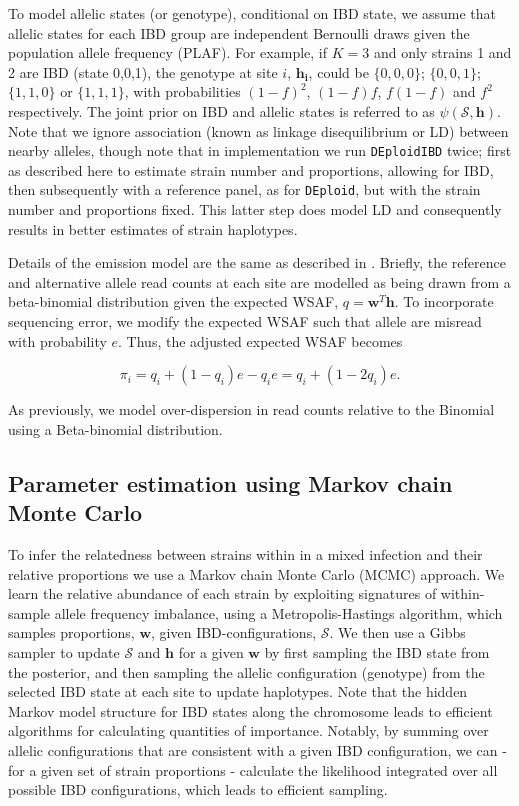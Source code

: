 \documentclass[9pt]{article}
\begin{document}
To model allelic states (or genotype), conditional on IBD state, we assume that allelic states for each IBD group are independent Bernoulli draws given the population allele frequency (PLAF).   For example, if $K=3$ and only strains 1 and 2 are IBD (state 0,0,1), the genotype at site $i$, $\mathbf{h_i}$, could be $\{0,0,0\}$; $\{0,0,1\}$; $\{1,1,0\}$ or $\{1,1,1\}$, with probabilities $(1-f)^2$, $(1-f)f$, $f(1-f)$ and $f^2$ respectively.   The joint prior on IBD and allelic states is referred to as $\psi(\mathcal{S},\mathbf{h})$.  Note that we ignore association (known as linkage disequilibrium or LD) between nearby alleles, though note that in implementation we run \texttt{DEploidIBD} twice; first as described here to estimate strain number and proportions, allowing for IBD, then subsequently with a reference panel, as for \texttt{DEploid}, but with the strain number and proportions fixed.  This latter step does model LD and consequently results in better estimates of strain haplotypes.

Details of the emission model are the same as described in \citet{Zhu2017}.  Briefly, the reference and alternative allele read counts at each site are modelled as being drawn from a beta-binomial distribution given the expected WSAF, $q = \mathbf{w}^T \mathbf{h}$.  To incorporate sequencing error, we modify the expected WSAF such that allele are misread with probability $e$. Thus, the adjusted expected WSAF becomes

\begin{equation} \label{eqn:adj_q}
\pi_i = q_i + (1 - q_i)e - q_ie = q_i + (1 - 2q_i)e.
\end{equation}

\noindent As previously, we model over-dispersion in read counts relative to the Binomial using a Beta-binomial distribution.


\subsection{Parameter estimation using Markov chain Monte Carlo}

To infer the relatedness between strains within in a mixed infection and their relative proportions we use a Markov chain Monte Carlo (MCMC) approach. We learn the relative abundance of each strain by exploiting signatures of within-sample allele frequency imbalance, using a Metropolis-Hastings algorithm, which samples proportions, $\mathbf{w}$,  given IBD-configurations, $\mathcal{S}$. We then use a Gibbs sampler to update $\mathcal{S}$ and $\mathbf{h}$ for a given $\mathbf{w}$ by first sampling the IBD state from the posterior, and then sampling the allelic configuration (genotype) from the selected IBD state at each site to update haplotypes.  Note that the hidden Markov model structure for IBD states along the chromosome leads to efficient algorithms for calculating quantities of importance.  Notably, by summing over allelic configurations that are consistent with a given IBD configuration, we can - for a given set of strain proportions - calculate the likelihood integrated over all possible IBD configurations, which leads to efficient sampling.
\end{document}
